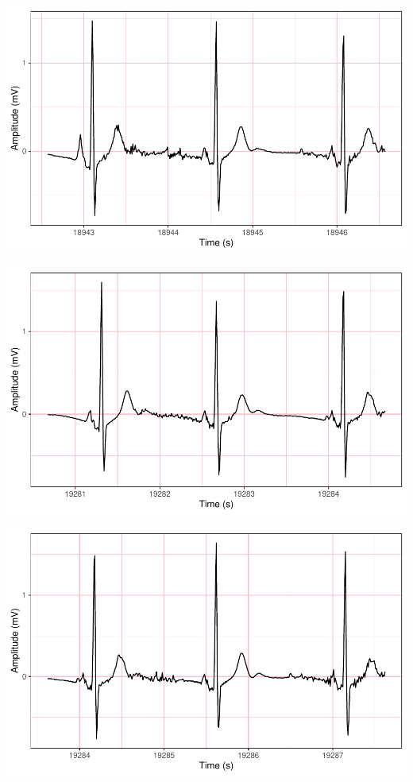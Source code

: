 \documentclass[
]{article}
\begin{document}
\begin{center}\includegraphics{report_files/figure-latex/abnormal-interval-33} \end{center}

\begin{center}\includegraphics{report_files/figure-latex/abnormal-interval-34} \end{center}

\begin{center}\includegraphics{report_files/figure-latex/abnormal-interval-35} \end{center}
\end{document}
